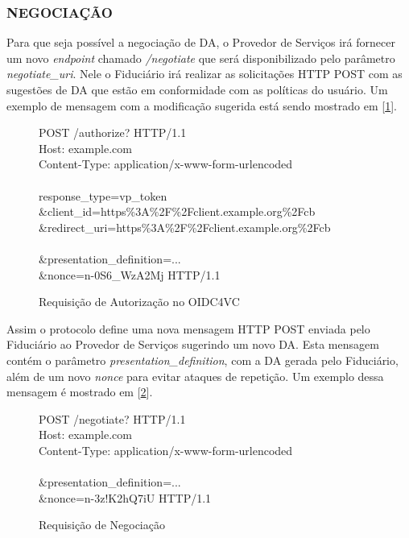 \subsubsection{NEGOCIAÇÃO}


Para que seja possível a negociação de DA, o Provedor de Serviços irá fornecer um novo \textit{endpoint} chamado \textit{/negotiate} que será disponibilizado pelo parâmetro \textit{negotiate\_uri}. Nele o Fiduciário irá realizar as solicitações HTTP POST com as sugestões de DA que estão em conformidade com as políticas do usuário. Um exemplo de mensagem com a modificação sugerida está sendo mostrado em [\ref{fig:auth-req-with-negotiate-oidc4vc}]. 

\begin{figure}[h]

    {\couriernew
    POST /authorize? HTTP/1.1\\
    Host: example.com \\
    Content-Type: application/x-www-form-urlencoded\\\\
    response\_type=vp\_token\\
    \&client\_id=https\%3A\%2F\%2Fclient.example.org\%2Fcb \\
    \&redirect\_uri=https\%3A\%2F\%2Fclient.example.org\%2Fcb \\
    \textbf{\color{red}{\&negotiate\_uri=https\%3A\%2F\%2Fclient.example.org\%2Fcb}} \\
    \&presentation\_definition=... \\
    \&nonce=n-0S6\_WzA2Mj HTTP/1.1 \\
    }
    
  \caption{Requisição de Autorização no OIDC4VC}
  \label{fig:auth-req-with-negotiate-oidc4vc}
\end{figure}

Assim o protocolo define uma nova mensagem HTTP POST enviada pelo Fiduciário ao Provedor de Serviços sugerindo um novo DA. Esta mensagem contém o parâmetro \textit{presentation\_definition}, com a DA gerada pelo Fiduciário, além de um novo \textit{nonce} para evitar ataques de repetição. Um exemplo dessa mensagem é mostrado em [\ref{fig:negotiate-request}]. 


\begin{figure}[h]    
    {\couriernew
    POST /negotiate? HTTP/1.1\\
    Host: example.com \\
    Content-Type: application/x-www-form-urlencoded\\\\
    \&presentation\_definition=... \\
    \&nonce=n-3z!K2hQ7iU HTTP/1.1\\
    }
  \caption{Requisição de Negociação}
  \label{fig:negotiate-request}
\end{figure}

